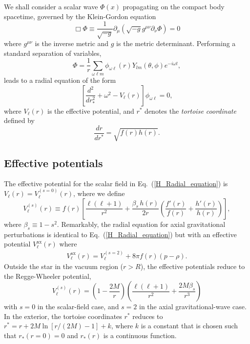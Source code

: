 \documentclass[aps,prd,longbibliography,reprint,twocolumn,amsmath,amssymb,amsfonts,showpacs,superscriptaddress]{revtex4-1}%
\begin{document}
We shall consider a scalar wave $\Phi(x)$ propagating on the compact body spacetime, governed by the Klein-Gordon equation
\begin{equation}
\Box \Phi \equiv \frac{1}{\sqrt{-g}} \partial_{\mu} \left( \sqrt{-g} g^{\mu \nu} \partial_{\nu} \Phi \right) = 0
\end{equation}
where $g^{\mu \nu}$ is the inverse metric and
$
g %
$
 is the metric determinant. Performing a standard separation of variables,
\begin{equation}
\Phi = \frac{1}{r} \sum_{\omega \ell m} \phi_{\omega \ell}(r)  Y_{lm}(\theta, \phi) e^{-i \omega t} ,
\label{eq:sepvariables}
\end{equation}
leads to a radial equation of the form
\begin{equation}
\label{H_Radial_equation}
\left[\frac{d^{2}}{dr_{\ast}^{2}}+\omega^{2}-V_{\ell}(r)\right]\phi_{\omega\ell}= 0,
\end{equation}
where $V_{\ell}(r)$ is the effective potential, and $r^\ast$ denotes the \emph{tortoise coordinate} defined by
\begin{equation}
\frac{dr}{dr^\ast} =\sqrt{f(r)h(r)} .  \label{eq:tortoise}
\end{equation}

\subsection{Effective potentials}\label{subsec:Potentials}
The effective potential for the scalar field in Eq.~(\ref{H_Radial_equation}) is $V_{\ell}(r) = V_{\ell}^{(s=0)}(r)$, where we define
\begin{equation}\label{Inside_Potentiel}
  V_{\ell}^{(s)}(r) \equiv f(r)\left[\frac{\ell(\ell+1)}{r^2}+\frac{\beta_s \, h(r)}{2r}\left(\frac{f'(r)}{f(r)}+\frac{h'(r)}{h(r)}\right)\right] ,
\end{equation}
where $\beta_s \equiv 1-s^2$. 
Remarkably, the radial equation for axial gravitational perturbations is identical to Eq.~(\ref{H_Radial_equation}) but with an effective potential $V_{\ell}^{\text{ax}}(r)$ where \cite{Cardoso:2014sna}
\begin{eqnarray}\label{RW_Potentiel_axialGW}
V_{\ell}^{\text{ax}}(r) = V_{\ell}^{(s=2)} + 8 \pi f(r) (p - \rho)  .
\end{eqnarray}
%
Outside the star in the vacuum region ($r>R$), the effective potentials reduce to the Regge-Wheeler potential,
\begin{equation}\label{RW_Potentiel}
V^{(s)}_{\ell}(r) =\left(1-\frac{2M}{r}\right)\left(\frac{\ell(\ell+1)}{r^2}+\frac{2M \beta_s}{r^3}\right)
\end{equation}
with $s=0$ in the scalar-field case, and $s=2$ in the axial gravitational-wave case. In the exterior, the tortoise coordinates $r^\ast$ reduces to $r^\ast = r+ 2M \ln [r/(2M) -1]+k$, where $k$ is a constant that is chosen such that $r_\ast(r=0) = 0$ and $r_\ast(r)$ is a continuous function.
\end{document}
